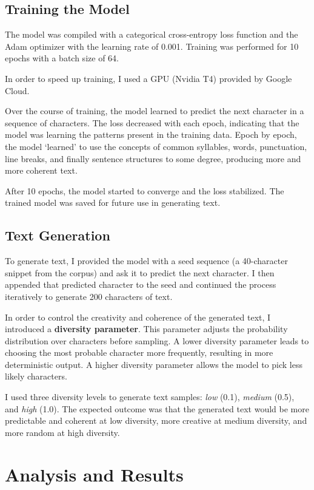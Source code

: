 \documentclass{article}
\begin{document}
\subsection{Training the Model}

The model was compiled with a categorical cross-entropy loss function and the Adam optimizer with the learning rate of 0.001. Training was performed for 10 epochs with a batch size of 64.

In order to speed up training, I used a GPU (Nvidia T4) provided by Google Cloud.

Over the course of training, the model learned to predict the next character in a sequence of characters. The loss decreased with each epoch, indicating that the model was learning the patterns present in the training data. Epoch by epoch, the model `learned' to use the concepts of common syllables, words, punctuation, line breaks, and finally sentence structures to some degree, producing more and more coherent text.

After 10 epochs, the model started to converge and the loss stabilized. The trained model was saved for future use in generating text.

\subsection{Text Generation}

To generate text, I provided the model with a seed sequence (a 40-character snippet from the corpus) and ask it to predict the next character. I then appended that predicted character to the seed and continued the process iteratively to generate 200 characters of text.

In order to control the creativity and coherence of the generated text, I introduced a \textbf{diversity parameter}. This parameter adjusts the probability distribution over characters before sampling. A lower diversity parameter leads to choosing the most probable character more frequently, resulting in more deterministic output. A higher diversity parameter allows the model to pick less likely characters.

I used three diversity levels to generate text samples: \textit{low} (0.1), \textit{medium} (0.5), and \textit{high} (1.0). The expected outcome was that the generated text would be more predictable and coherent at low diversity, more creative at medium diversity, and more random at high diversity.

\section{Analysis and Results}
\end{document}
